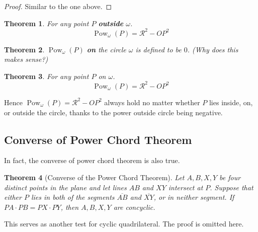 \documentclass{article}
\DeclareMathOperator{\Pow}{Pow}
\newtheorem{theorem}{Theorem}[section]
\theoremstyle{definition}
\begin{document}
\begin{proof}
	Similar to the one above.
\end{proof}

\begin{mdframed}
	\begin{theorem}
		For any point $P$ \textbf{outside} $\omega$.
		\begin{equation*}
			\Pow_\omega(P) = \mathcal{R}^2 - OP^2	
		\end{equation*}
	\end{theorem}
\end{mdframed}

\begin{mdframed}
	\begin{theorem}
		$\Pow_\omega(P)$ \textbf{on} the circle $\omega$ is defined to be $0$. (Why does this makes sense?)
	\end{theorem}
\end{mdframed}

\begin{mdframed}
	\begin{theorem}
		For any point $P$ on $\omega$.
		\begin{equation*}
			\Pow_\omega(P) = \mathcal{R}^2 - OP^2	
		\end{equation*}
	\end{theorem}
\end{mdframed}

Hence $\Pow_\omega(P) = \mathcal{R}^2 - OP^2$ always hold no matter whether $P$ lies inside, on, or outside the circle, thanks to the power outside circle being negative.

\subsection{Converse of Power Chord Theorem}

In fact, the converse of power chord theorem is also true.	
\begin{mdframed}
	\begin{theorem}[Converse of the Power Chord Theorem]
		Let $A,B,X,Y$ be four distinct points in the plane and let lines  $AB$ and  $XY$ intersect at $P$. Suppose that either $P$ lies in both of the segments $\overline{AB}$ and $\overline{XY}$, or in neither segment. If $PA \cdot PB = PX \cdot PY$, then $A, B, X, Y$ are concyclic.
	\end{theorem}
\end{mdframed}
This serves as another test for cyclic quadrilateral. The proof is omitted here.
\end{document}
